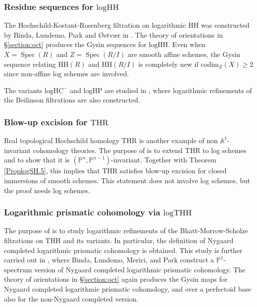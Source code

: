 \documentclass[11pt, a4paper]{amsart}
\theoremstyle{definition}
\numberwithin{equation}{subsection}
\renewcommand{\P}{\mathbb{P}}
\newcommand{\A}{\mathbb{A}}
\providecommand{\Spec}[1]{\operatorname{Spec}(#1)} 	%
\newcommand{\HH}{\mathrm{HH}}
\newcommand{\THH}{\mathrm{THH}}
\newcommand{\logTHH}{\mathrm{logTHH}}
\newcommand{\logHH}{\mathrm{logHH}}
\begin{document}
\subsubsection{Residue sequences for $\logHH$} The Hochschild-Kostant-Rosenberg filtration on logarithmic $\HH$ was constructed by Binda, Lundemo, Park and \O stv\ae r in \cite{BLPO}.
The theory of orientations in \S \ref{section:oct} produces the Gysin sequences for $\logHH$.
Even when $X=\Spec{R}$ and $Z=\Spec{R/I}$ are smooth affine schemes, the Gysin sequence relating $\HH(R)$ and $\HH(R/I)$ is completely new if $\mathrm{codim}_Z(X)\geq 2$ since non-affine log schemes are involved.

The variants $\mathrm{logHC}^-$ and $\mathrm{logHP}$ are studied in \cite{BLPO2},
where logarithmic refinements of the Beilinson filtrations \cite{Ant19} are also constructed. 


\subsubsection{Blow-up excision for $\mathrm{THR}$} Real topological Hochschild homology $\mathrm{THR}$ is another example of non $\A^1$-invariant cohomology theories.
The purpose of \cite{2305.04150} is to extend $\mathrm{THR}$ to log schemes and to show that it is $(\P^n,\P^{n-1})$-invariant.
Together with Theorem \ref{ProplogSH.5},
this implies that $\mathrm{THR}$ satisfies blow-up excision for closed immersions of smooth schemes.
This statement does not involve log schemes,
but the proof needs log schemes.


\subsubsection{Logarithmic prismatic cohomology via $\logTHH$} The purpose of \cite{BLPO2} is to study logarithmic refinements of the Bhatt-Morrow-Scholze filtrations \cite{BMS19} on $\THH$ and its variants.
In particular,
the definition of Nygaard completed logarithmic prismatic cohomology is obtained.
This study is further carried out in \cite{BLMP},
where
Binda, Lundemo, Merici, and Park
construct a $\P^1$-spectrum version of Nygaard completed logarithmic prismatic cohomology.
The theory of orientations in \S \ref{section:oct} again produces the Gysin maps for Nygaard completed logarithmic prismatic cohomology, and over a perfectoid base also for the non-Nygaard completed version. 
\end{document}
